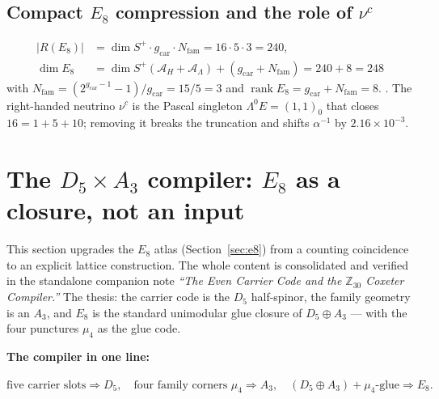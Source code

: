 \documentclass[11pt,a4paper]{article}
\newcommand{\gcar}{g_{\mathrm{car}}}
\newcommand{\Nfam}{N_{\mathrm{fam}}}
\newcommand{\AL}{\mathcal A_\Lambda}
\newcommand{\AH}{\mathcal A_H}
\theoremstyle{definition}
\begin{document}
\subsection{Compact $E_8$ compression and the role of $\nu^c$}
\begin{equation}
  \boxed{\ \begin{aligned}
    |R(E_8)|&=\dim S^+\cdot\gcar\cdot\Nfam=16\cdot5\cdot3=240,\\
    \dim E_8&=\dim S^+(\AH+\AL)+(\gcar+\Nfam)=240+8=248
  \end{aligned}\ }
\end{equation}
with $\Nfam=(2^{\gcar-1}-1)/\gcar=15/5=3$ and $\operatorname{rank}E_8=\gcar+\Nfam=8$. \mE. The
right-handed neutrino $\nu^c$ is the Pascal singleton $\Lambda^0E=(1,1)_0$ that closes $16=1+5+10$;
removing it breaks the truncation and shifts $\alpha^{-1}$ by $2.16\times10^{-3}$.

\section{The $D_5\times A_3$ compiler: $E_8$ as a closure, not an input}
\label{sec:d5a3}
This section upgrades the $E_8$ atlas (Section~\ref{sec:e8}) from a counting coincidence to an explicit
lattice construction. The whole content is consolidated and verified in the standalone companion note
\emph{``The Even Carrier Code and the $\mathbb Z_{30}$ Coxeter Compiler.''} The thesis: the carrier
code is the $D_5$ half-spinor, the family geometry is an $A_3$, and $E_8$ is the standard unimodular
glue closure of $D_5\oplus A_3$ --- with the four punctures $\mu_4$ as the glue code.

\TFPTeightglue

\par\smallskip\noindent\textbf{The compiler in one line:}
\begin{keyeq}
$\displaystyle \text{five carrier slots}\Rightarrow D_5,\quad
  \text{four family corners }\mu_4\Rightarrow A_3,\quad
  (D_5\oplus A_3)+\mu_4\text{-glue}\Rightarrow E_8.$
\end{keyeq}
\end{document}
